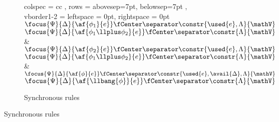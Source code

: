 \begin{figure}[h!]
	\ContinuedFloat
	\begin{subfigure}{\textwidth}
		\centering
		\begin{tblr}{ colspec = { cc } 
			    , rows = {abovesep=7pt, belowsep=7pt}
			    , vborder{1-2} = { leftspace = 0pt, rightspace = 0pt } 
			    }
			 {\footnotesize
			\LeftLabel{\derRule{\displayten}}
			\DP}
			\\ 
			{\footnotesize
			\AX$\focus{\Psi}{\Delta}{\af{\phi_1}{e}} \fCenter \separator \constr{\used{e}, \Lambda}{\mathV}$
			\LeftLabel{\derRule{\displayplus[L]}}
			\UI$\focus{\Psi}{\Delta}{\af{\phi_1 \llplus \phi_2}{e}} \fCenter \separator \constr{\Lambda}{\mathV}$
			\DP}
			&
			{\footnotesize
			\AX$\focus{\Psi}{\Delta}{\af{\phi_2}{e}} \fCenter \separator \constr{\used{e}, \Lambda}{\mathV}$
			\LeftLabel{\derRule{\displayplus[R]}}
			\UI$\focus{\Psi}{\Delta}{\af{\phi_1 \llplus \phi_2}{e}} \fCenter \separator \constr{\Lambda}{\mathV}$
			\DP}
			\\
			{\footnotesize
			\LeftLabel{\derRule{\displayone}}
			\DP} 
			&
			{\footnotesize
			\AX$\focus{\Psi}{\Delta}{\af{\phi}{e}} \fCenter \separator \constr{\used{e}, \avail{\Delta}, \Lambda }{\mathV}$
			\LeftLabel{\derRule{\displaybang}}
			\UI$\focus{\Psi}{\Delta}{\af{\llbang{\phi}}{e}} \fCenter \separator \constr{\Lambda}{\mathV}$
			\DP
			}
			\\
			 {\footnotesize
			\LeftLabel{\derRule{\displaytoasy}}
			\DP
			}
		\end{tblr}
		\caption{Synchronous rules}
	\end{subfigure}
\end{figure}
